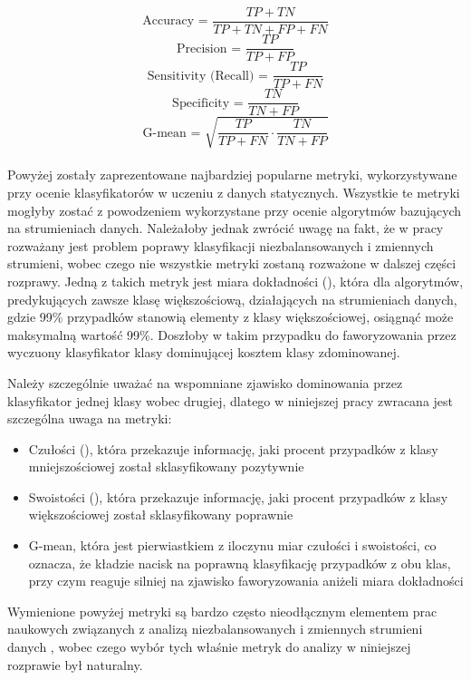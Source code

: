 $$\textrm{Accuracy = }\frac{TP + TN}{TP + TN + FP + FN}$$
$$\textrm{Precision = }\frac{TP}{TP + FP}$$
$$\textrm{Sensitivity (Recall) = }\frac{TP}{TP + FN}$$
$$\textrm{Specificity = }\frac{TN}{TN + FP}$$
$$\textrm{G-mean = }\sqrt{\frac{TP}{TP + FN} \cdot \frac{TN}{TN + FP}}$$\\

\noindent Powyżej zostały zaprezentowane najbardziej popularne metryki, wykorzystywane przy ocenie klasyfikatorów w uczeniu z danych statycznych. Wszystkie te metryki mogłyby zostać z powodzeniem wykorzystane przy ocenie algorytmów bazujących na strumieniach danych. Należałoby jednak zwrócić uwagę na fakt, że w pracy rozważany jest problem poprawy klasyfikacji niezbalansowanych i zmiennych strumieni, wobec czego nie wszystkie metryki zostaną rozważone w dalszej części rozprawy. Jedną z takich metryk jest miara dokładności (), która dla algorytmów, predykujących zawsze klasę większościową, działających na strumieniach danych, gdzie 99\% przypadków stanowią elementy z klasy większościowej, osiągnąć może maksymalną wartość 99\%. Doszłoby w takim przypadku do faworyzowania przez wyczuony klasyfikator klasy dominującej kosztem klasy zdominowanej.

Należy szczególnie uważać na wspomniane zjawisko dominowania przez klasyfikator jednej klasy wobec drugiej, dlatego w niniejszej pracy zwracana jest szczególna uwaga na metryki:

\begin{itemize}
    \item Czułości (), która przekazuje informację, jaki procent przypadków z klasy mniejszościowej został sklasyfikowany pozytywnie
    \item Swoistości (), która przekazuje informację, jaki procent przypadków z klasy większościowej został sklasyfikowany poprawnie
    \item G-mean, która jest pierwiastkiem z iloczynu miar czułości i swoistości, co oznacza, że kładzie nacisk na poprawną klasyfikację przypadków z obu klas, przy czym reaguje silniej na zjawisko faworyzowania aniżeli miara dokładności
\end{itemize}

Wymienione powyżej metryki są bardzo często nieodłącznym elementem prac naukowych związanych z analizą niezbalansowanych i zmiennych strumieni danych \cite{Article:TypyPrzykladow}\cite{Inbook:Metrics}\cite{Article:OBFirst}\cite{Article:OBSecond}, wobec czego wybór tych właśnie metryk do analizy w niniejszej rozprawie był naturalny.

